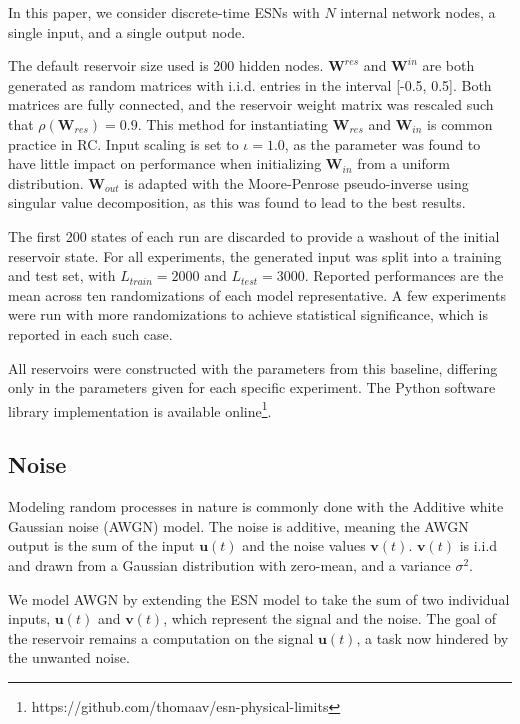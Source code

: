     In this paper, we consider discrete-time ESNs with $N$ internal network nodes, a
single input, and a single output node.

The default reservoir size used is 200 hidden nodes. $\mathbf{W}^{res}$ and
$\mathbf{W}^{in}$ are both generated as random matrices with i.i.d. entries in
the interval [-0.5, 0.5]. Both matrices are fully connected, and the reservoir
weight matrix was rescaled such that $\rho(\mathbf{W}_{res}) = 0.9$. This method
for instantiating $\mathbf{W}_{res}$ and $\mathbf{W}_{in}$ is common practice in
RC. Input scaling is set to $\iota = 1.0$, as the parameter was found to have
little impact on performance when initializing $\mathbf{W}_{in}$ from a uniform
distribution. $\mathbf{W}_{out}$ is adapted with the Moore-Penrose
pseudo-inverse using singular value decomposition, as this was found to lead to
the best results.

The first 200 states of each run are discarded to provide a washout of the
initial reservoir state. For all experiments, the generated input was split into
a training and test set, with $L_{train} = 2000$ and $L_{test} = 3000$. Reported
performances are the mean across ten randomizations of each model
representative. A few experiments were run with more randomizations to achieve
statistical significance, which is reported in each such case.

All reservoirs were constructed with the parameters from this baseline,
differing only in the parameters given for each specific experiment. The Python
software library implementation is available
online\footnote{https://github.com/thomaav/esn-physical-limits}.

\subsection{Noise}

Modeling random processes in nature is commonly done with the Additive white
Gaussian noise (AWGN) model. The noise is additive, meaning the AWGN output is
the sum of the input $\mathbf{u}(t)$ and the noise values
$\mathbf{v}(t)$. $\mathbf{v}(t)$ is i.i.d and drawn from a Gaussian distribution
with zero-mean, and a variance $\sigma^{2}$.

We model AWGN by extending the ESN model to take the sum of two individual
inputs, $\mathbf{u}(t)$ and $\mathbf{v}(t)$, which represent the signal and the
noise. The goal of the reservoir remains a computation on the signal
$\mathbf{u}(t)$, a task now hindered by the unwanted noise.

